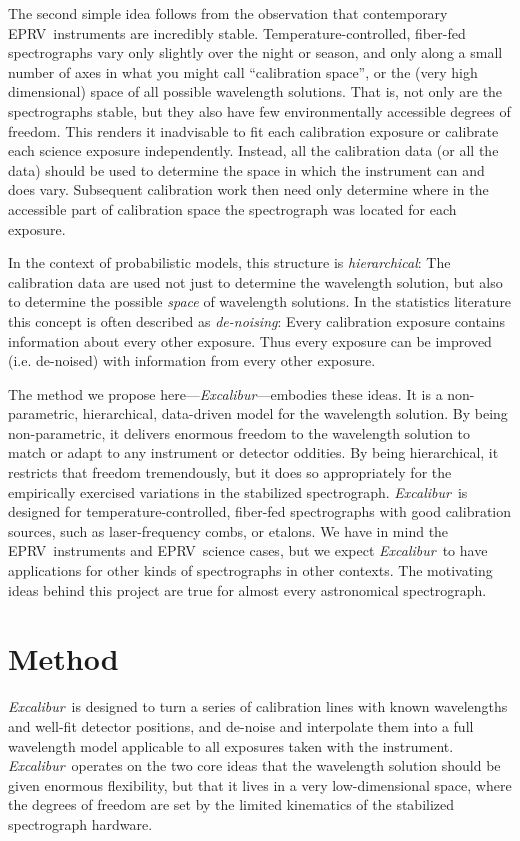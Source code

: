\documentclass[12pt, onecolumn]{aastex63}
\newcommand{\project}[1]{\textsl{#1}}
\newcommand{\name}{\project{Excalibur}}
\newcommand{\acronym}[1]{{\small{#1}}}
\newcommand{\eprv}{\acronym{EPRV}}
\begin{document}
The second simple idea follows from the observation that contemporary \eprv\ instruments are incredibly stable.  Temperature-controlled, fiber-fed spectrographs vary only slightly over the night or season, and only along a small number of axes in what you might call ``calibration space'', or the (very high dimensional) space of all possible wavelength solutions.  That is, not only are the spectrographs stable, but they also have few environmentally accessible degrees of freedom.  This renders it inadvisable to fit each calibration exposure or calibrate each science exposure independently.  Instead, all the calibration data (or all the data) should be used to determine the space in which the instrument can and does vary.  Subsequent calibration work then need only determine where in the accessible part of calibration space the spectrograph was located for each exposure.

In the context of probabilistic models, this structure is \emph{hierarchical}:  The calibration data are used not just to determine the wavelength solution, but also to determine the possible \emph{space} of wavelength solutions.  In the statistics literature this concept is often described as \emph{de-noising}:  Every calibration exposure contains information about every other exposure.  Thus every exposure can be improved (i.e. de-noised) with information from every other exposure.

The method we propose here---\name---embodies these ideas.
It is a non-parametric, hierarchical, data-driven model for the wavelength solution.  By being non-parametric, it delivers enormous freedom to the wavelength solution to match or adapt to any instrument or detector oddities.  By being hierarchical, it restricts that freedom tremendously, but it does so appropriately for the empirically exercised variations in the stabilized spectrograph.  \name\ is designed for temperature-controlled, fiber-fed spectrographs with good calibration sources, such as laser-frequency combs, or etalons.  We have in mind the \eprv\ instruments and \eprv\ science cases, but we expect \name\ to have applications for other kinds of spectrographs in other contexts.  The motivating ideas behind this project are true for almost every astronomical spectrograph.

\section{Method} \label{sec:method}
\name\ is designed to turn a series of calibration lines with known wavelengths and well-fit detector positions, and de-noise and interpolate them into a full wavelength model applicable to all exposures taken with the instrument.  \name\ operates on the two core ideas that the wavelength solution should be given enormous flexibility, but that it lives in a very low-dimensional space, where the degrees of freedom are set by the limited kinematics of the stabilized spectrograph hardware.
\end{document}
